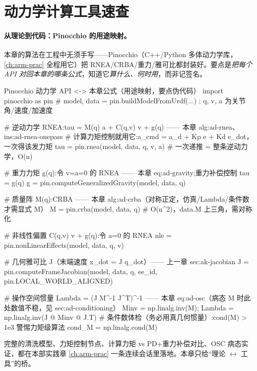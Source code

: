 \section{动力学计算工具速查}
\label{sec:ad-practice}

\paragraph{从理论到代码：Pinocchio 的用途映射。}
本章的算法在工程中无须手写——Pinocchio（C++/Python 多体动力学库，\cref{ch:arm-prac} 全程用它）把 RNEA/CRBA/重力/雅可比都封装好。要点是\emph{把每个 API 对回本章的哪条公式}，知道它\emph{算什么、何时用}，而非记签名。

\begin{codebox}[Python]{Pinocchio 动力学 API <-> 本章公式（用途映射，要点伪代码）}
import pinocchio as pin
# model, data = pin.buildModelFromUrdf(...) ; q, v, a 为关节角/速度/加速度

# 逆动力学 RNEA:tau = M(q) a + C(q,v) v + g(q)  —— 本章 alg:ad-rnea、ins:ad-rnea-onepass
# 计算力矩控制就用它:a_cmd = a_d + Kp e + Kd e_dot，一次得该发力矩
tau = pin.rnea(model, data, q, v, a)              # 一次递推 = 整条逆动力学，O(n)

# 重力力矩 g(q):令 v=a=0 的 RNEA —— 本章 eq:ad-gravity;重力补偿控制 tau = g(q)
g = pin.computeGeneralizedGravity(model, data, q)

# 质量阵 M(q):CRBA —— 本章 alg:ad-crba（对称正定，仿真/Lambda/条件数才需显式 M）
M = pin.crba(model, data, q)                      # O(n^2)，data.M 上三角，需对称化

# 非线性偏置 C(q,v) v + g(q):令 a=0 的 RNEA
nle = pin.nonLinearEffects(model, data, q, v)

# 几何雅可比 J（末端速度 x_dot = J q_dot）—— 上一章 sec:ak-jacobian
J = pin.computeFrameJacobian(model, data, q, ee_id, pin.LOCAL_WORLD_ALIGNED)

# 操作空间惯量 Lambda = (J M^-1 J^T)^-1 —— 本章 eq:ad-osc（病态 M 时此处数值不稳，见 sec:ad-conditioning）
Minv = np.linalg.inv(M); Lambda = np.linalg.inv(J @ Minv @ J.T)
# 条件数体检（务必用真几何惯量）:cond(M) > 1e3 警惕力矩级算法
cond_M = np.linalg.cond(M)
\end{codebox}

\noindent 完整的清洗模型、力矩控制节点、计算力矩 vs PD+重力补偿对比、OSC 病态实证，都在本部实践章 \cref{ch:arm-prac} 一条连续会话里落地。本章只给“理论 $\leftrightarrow$ 工具”的桥。


